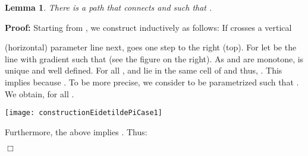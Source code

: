 \documentclass[a4paper,11pt]{article}
\newtheorem{lemma}{Lemma}
\newenvironment{proof}{\textbf{Proof:}}{\hspace*{0mm}\hfill\ensuremath{\Box}}
\begin{document}
\begin{lemma}\label{lem:apprQualityG1}
	There is a path  that connects  and  such that .
\end{lemma}
\begin{proof} Starting from , we construct  inductively as follows: If  crosses  a vertical
	
\noindent\begin{minipage}{0.8\linewidth}\vspace*{0.5ex}
 (horizontal) parameter line next,  goes one step to the right (top). For  let  be the line with gradient  such that  (see the figure on the right). As  and  are monotone,  is unique and well defined. For all ,   and  lie in the same cell of  and thus, . This implies  because . To be more precise, we consider  to be parametrized such that . We obtain,  for all .
\end{minipage}
\begin{minipage}{0.2\linewidth}
  \begin{center}
    \texttt{[image: constructionEidetildePiCase1]}
  \end{center}
\end{minipage}\vspace*{0.5ex}
	  Furthermore, the above implies  . Thus:
	
\end{proof}
\end{document}
